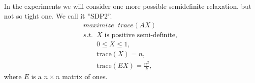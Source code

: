 In the experiments we will consider one more possible semidefinite relaxation, but not so tight one. We call it ''SDP2''.
\begin{equation}
    \begin{aligned}
    &maximize\;\;trace(AX)\\
    &s.t. \;\;X \text{ is positive semi-definite}, \\
    &\;\;\;\;\;\;\; 0 \leq X \leq 1, \\
    &\;\;\;\;\;\;\; \text{trace}(X) = n, \\
    &\;\;\;\;\;\;\; \text{trace}(EX) = \frac{n^2}k,
    \nonumber
    \end{aligned}
\end{equation}
where $E$ is a $n\times n$ matrix of ones.

\begin{equation}
    \begin{aligned}
    \nonumber
    \end{aligned}
\end{equation}
